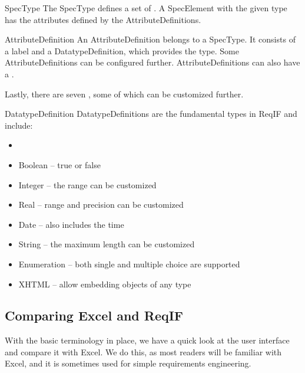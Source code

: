 \begin{definition}{SpecType}
The SpecType defines a set of .  A SpecElement with the given type has the attributes defined by the AttributeDefinitions.
\end{definition}

\begin{definition}{AttributeDefinition}
An AttributeDefinition belongs to a SpecType. It consists of a label and a DatatypeDefinition, which provides the type.  Some AttributeDefinitions can be configured further.  AttributeDefinitions can also have a .
\end{definition}

Lastly, there are seven , some of which can be customized further.

\begin{definition}{DatatypeDefinition}
DatatypeDefinitions are the fundamental types in ReqIF and include:

\begin{itemize}
\item
\item Boolean -- true or false
\item Integer -- the range can be customized
\item Real -- range and precision can be customized
\item Date -- also includes the time
\item String -- the maximum length can be customized
\item Enumeration -- both single and multiple choice are supported
\item XHTML -- allow embedding objects of any type
\end{itemize}
\end{definition}

\subsection{Comparing Excel and ReqIF}
\label{sec:excel_reqif}

With the basic terminology in place, we have a quick look at the \pror{} user interface and compare it with Excel.  We do this, as most readers will be familiar with Excel, and it is sometimes used for simple requirements engineering. 


